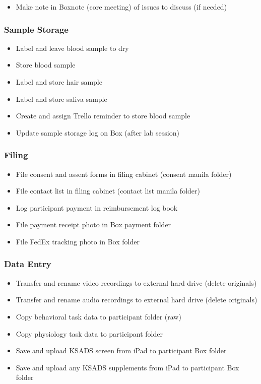 \documentclass[
]{book}
\providecommand{\tightlist}{%
  \setlength{\itemsep}{0pt}\setlength{\parskip}{0pt}}
\begin{document}
\begin{itemize}
\tightlist
\item
  Make note in Boxnote (core meeting) of issues to discuss (if needed)
\end{itemize}

\hypertarget{sample-storage}{%
\subsubsection{Sample Storage}\label{sample-storage}}

\begin{itemize}
\tightlist
\item
  Label and leave blood sample to dry
\item
  Store blood sample
\item
  Label and store hair sample
\item
  Label and store saliva sample
\item
  Create and assign Trello reminder to store blood sample
\item
  Update sample storage log on Box (after lab session)
\end{itemize}

\hypertarget{filing}{%
\subsubsection{Filing}\label{filing}}

\begin{itemize}
\tightlist
\item
  File consent and assent forms in filing cabinet (consent manila folder)
\item
  File contact list in filing cabinet (contact list manila folder)
\item
  Log participant payment in reimbursement log book
\item
  File payment receipt photo in Box payment folder
\item
  File FedEx tracking photo in Box folder
\end{itemize}

\hypertarget{data-entry}{%
\subsubsection{Data Entry}\label{data-entry}}

\begin{itemize}
\tightlist
\item
  Transfer and rename video recordings to external hard drive (delete originals)
\item
  Transfer and rename audio recordings to external hard drive (delete originals)
\item
  Copy behavioral task data to participant folder (raw)
\item
  Copy physiology task data to participant folder
\item
  Save and upload KSADS screen from iPad to participant Box folder
\item
  Save and upload any KSADS supplements from iPad to participant Box folder
\end{itemize}
\end{document}
